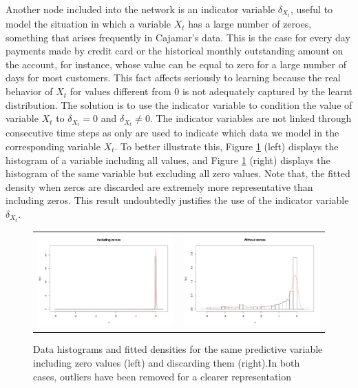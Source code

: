 Another node included into the network is an indicator variable $\delta_{X_t}$, useful to model the situation in which a variable $X_t$ has a large number of zeroes, something that arises frequently in Cajamar's data. This is the case for every day payments made by credit card or the historical monthly outstanding amount on the account, for instance, whose value can be equal to zero for a large number of days for most customers. This fact affects seriously to learning because the real behavior of $X_t$ for values different from 0 is not adequately captured by the learnt distribution.
The solution is to use the indicator variable to condition the value of variable $X_t$ to $\delta_{X_t} = 0$ and $\delta_{X_t}\neq 0$. The indicator variables are not linked through consecutive time steps as only are used to indicate which data we model in the corresponding variable $X_t$. To better illustrate this, Figure \ref{fig:CajamarZeroes} (left) displays the histogram of a variable including all values, and Figure \ref{fig:CajamarZeroes} (right) displays the histogram of the same variable but excluding all zero values. Note that, the fitted density when zeros are discarded are extremely more representative than including zeros. This result undoubtedly justifies the use of the indicator variable $\delta_{X_t}$.

\begin{figure}[h]
  \centering
    \begin{tabular}{cc}    
       \includegraphics[width=70mm]{figures/with_zeroes}&
       \includegraphics[width=70mm]{figures/without_zeroes}
    \end{tabular}
    \caption{\label{fig:CajamarZeroes}Data histograms and fitted densities for the same predictive variable including zero values (left) and discarding them (right).In both cases, outliers have been removed for a clearer representation}

\end{figure}

